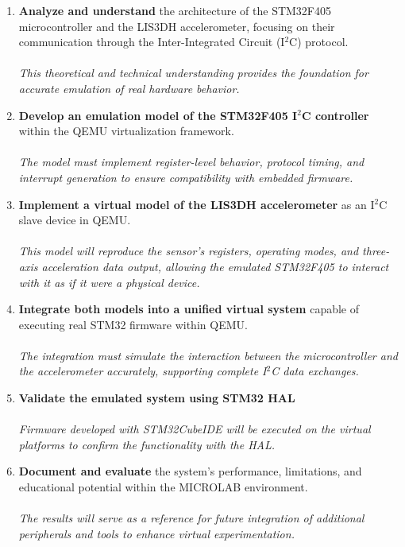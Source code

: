 \begin{enumerate}
    \item\textbf{Analyze and understand} the architecture of the STM32F405 microcontroller 
        and the LIS3DH accelerometer, focusing on their communication through 
        the Inter-Integrated Circuit (I$^2$C) protocol.\\\\
    \textit{This theoretical and technical understanding provides the foundation for 
        accurate emulation of real hardware behavior.}

    \item \textbf{Develop an emulation model of the STM32F405 I$^2$C controller} within 
        the QEMU virtualization framework.\\\\
    \textit{The model must implement register-level behavior, protocol timing, and 
        interrupt generation to ensure compatibility with embedded firmware.}

    \item \textbf{Implement a virtual model of the LIS3DH accelerometer} as an I$^2$C 
        slave device in QEMU.\\\\
    \textit{This model will reproduce the sensor's registers, operating modes, and 
        three-axis acceleration data output, allowing the emulated STM32F405 to interact 
        with it as if it were a physical device.}

    \item \textbf{Integrate both models into a unified virtual system} capable of executing 
        real STM32 firmware within QEMU.\\\\
    \textit{The integration must simulate the interaction between the microcontroller and 
        the accelerometer accurately, supporting complete I$^2$C data exchanges.}

    \item \textbf{Validate the emulated system using STM32 HAL} \\\\
    \textit{Firmware developed with STM32CubeIDE will be executed on the 
        virtual platforms to confirm the functionality with the HAL.}

    \item \textbf{Document and evaluate} the system's performance, limitations, and 
        educational potential within the MICROLAB environment.\\\\
    \textit{The results will serve as a reference for future integration of additional 
        peripherals and tools to enhance virtual experimentation.}
\end{enumerate}